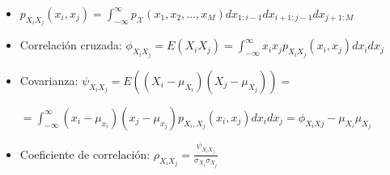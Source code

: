 \begin{frame}
\begin{itemize}
\begin{itemize}
{\begin{itemize}
\scriptsize
\item  $p_{X_iX_j}(x_i,x_j)\!\!= \int_{-\infty}^{\infty} p_{\mathcal{X}} (x_1,x_2,\dots,x_M)dx_{1:i-1} dx_{i+1:j-1}dx_{j+1:M}$

\vspace{0.1cm}

\item Correlación cruzada: $\phi_{X_iX_j}\!=\!E(X_iX_j)\!=\! \int_{-\infty}^{\infty}\!\! x_i x_j p_{X_iX_j}(x_i,x_j)dx_i dx_j$

\vspace{0.1cm}

\item Covarianza: $\psi_{X_iX_j}=E((X_i-\mu_{X_i})(X_j-\mu_{X_j}))=$

\hspace{0.5cm}$=\int_{-\infty}^{\infty} (x_i-\mu_{x_i}) (x_j-\mu_{x_j}) p_{X_i,X_j}(x_i,x_j)dx_i dx_j=\phi_{X_iXj}-\mu_{X_i}\mu_{X_j}$

\item Coeficiente de correlación: $\rho_{X_iX_j}=\frac{\psi_{X_iX_j}}{\sigma_{X_i}\sigma_{X_j}}$


\end{itemize}
}
 
\end{itemize}
\end{itemize}

\end{frame}

